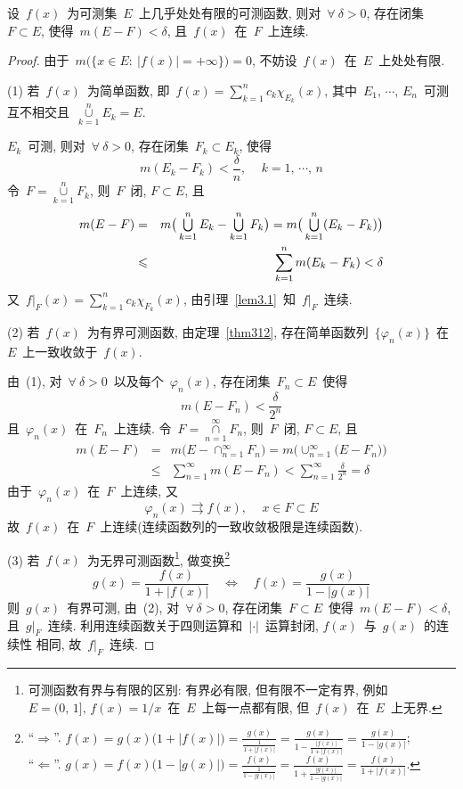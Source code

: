 \begin{theorem}
设~$f(x)$~为可测集~$E$~上几乎处处有限的可测函数, 则对~$\forall~\delta > 0$, 存在闭集~$F \subset E$, 使得~$m(E - F) < \delta$, 且~$f(x)$~在~$F$~上连续.
\end{theorem}

\begin{proof}
由于~$m\big( \{x \in E: \: |f(x)| = +\infty\} \big) = 0$, 不妨设~$f(x)$~在~$E$~上处处有限.

(1) 若~$f(x)$~为简单函数, 即~$f(x) = \sum\limits_{k=1}^n c_k \chi_{E_k} (x)$, 其中~$E_1, \, \cdots, \, E_n$~可测互不相交且~$\mathop{\cup}\limits_{k=1}^n E_k = E$.

$E_k$~可测, 则对~$\forall~\delta > 0$, 存在闭集~$F_k \subset E_k$, 使得
\[
m(E_k - F_k) < \frac{\delta}{n}, \, \quad k = 1,\,\cdots,\,n
\]
令~$F = \mathop{\cup}\limits_{k=1}^n F_k$, 则~$F$~闭, $F \subset E$, 且
\begin{eqnarray*}
m(E - F) &=& m\big(\mathop{\textstyle{\bigcup}}\limits_{k=1}^n E_k - \mathop{\textstyle{\bigcup}}\limits_{k=1}^n F_k \big) = m\big( \mathop{\textstyle{\bigcup}}\limits_{k=1}^n (E_k - F_k) \big) \\
&\leqslant& \sum_{k=1}^n m(E_k - F_k) < \delta
\end{eqnarray*}
又~$f|_F(x) = \sum\limits_{k=1}^n c_k \chi_{F_k}(x)$, 由引理~\ref{lem3.1}~知~$f|_F$~连续.

(2) 若~$f(x)$~为有界可测函数, 由定理~\ref{thm312}, 存在简单函数列~$\{\varphi_n(x)\}$~在~$E$~上一致收敛于~$f(x)$.

由~(1), 对~$\forall~\delta > 0$~以及每个~$\varphi_n(x)$, 存在闭集~$F_n \subset E$~使得
\[
m(E - F_n) < \frac{\delta}{2^n}
\]
且~$\varphi_n(x)$~在~$F_n$~上连续. 令~$F = \mathop{\cap}\limits_{n=1}^\infty F_n$, 则~$F$~闭, $F \subset E$, 且
\begin{eqnarray*}
m(E - F) &=& m\big( E - \mathop{\cap}_{n=1}^\infty F_n \big) = m\big( \mathop{\cup}_{n=1}^\infty \big(E - F_n\big) \big) \\
&\leqslant& \sum_{n=1}^\infty m(E - F_n) < \sum_{n=1}^\infty \frac{\delta}{2^n} = \delta
\end{eqnarray*}
由于~$\varphi_n(x)$~在~$F$~上连续, 又
\[
\varphi_n(x) \rightrightarrows f(x), \, \quad x \in F \subset E
\]
故~$f(x)$~在~$F$~上连续(连续函数列的一致收敛极限是连续函数).

(3) 若~$f(x)$~为无界可测函数\footnote{可测函数有界与有限的区别: 有界必有限, 但有限不一定有界, 例如~$E=(0,\,1], \, f(x) = 1/x$~在~$E$~上每一点都有限, 但~$f(x)$~在~$E$~上无界.}, 做变换\footnote{``$\Rightarrow$''. $f(x) = g(x) \big( 1 + |f(x)|\big) = \frac{g(x)}{\frac{1}{1 + |f(x)|}} = \frac{g(x)}{1- \frac{|f(x)|}{1 + |f(x)|}} = \frac{g(x)}{1- |g(x)|}$; \\ ``$\Leftarrow$''. $g(x) = f(x)\big(1- |g(x)|\big) = \frac{f(x)}{\frac{1}{1- |g(x)|}} = \frac{f(x)}{1 + \frac{|g(x)|}{1- |g(x)|}} = \frac{f(x)}{1+ |f(x)|}$.}
\[
g(x) = \frac{f(x)}{1+ |f(x)|} \quad \Longleftrightarrow \quad f(x) = \frac{g(x)}{1- |g(x)|}
\]
则~$g(x)$~有界可测, 由~(2), 对~$\forall~\delta > 0$, 存在闭集~$F \subset E$~使得~$m(E - F) < \delta$, 且~$g|_F$~连续. 利用连续函数关于四则运算和~$|\cdot|$~运算封闭, $f(x)$~与~$g(x)$~的连续性
相同, 故~$f|_F$~连续.
\end{proof}


